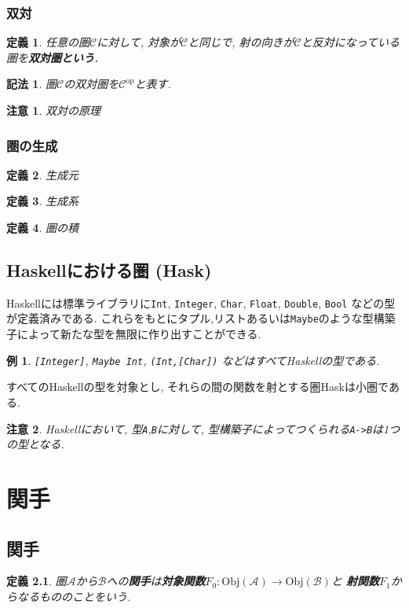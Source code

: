 \documentclass{jsbook}
\theoremstyle{plain}
\newtheorem{Def}{定義}[chapter]
\newtheorem{Notation}{記法}[chapter]
\newtheorem{caution}{注意}[chapter]
\newtheorem{example}{例}[chapter]
\begin{document}
\subsection{双対}
\begin{Def}
任意の圏$\mathscr{C}$に対して, 対象が$\mathscr{C}$と同じで, 射の向きが$\mathcal{C}$と反対になっている圏を\bf{双対圏}という.
\end{Def}
\begin{Notation}
圏$\mathscr{C}$の双対圏を$\mathscr{C}^{\mathrm{op}}$と表す.
\end{Notation}
\begin{caution}
双対の原理
\end{caution}
\subsection{圏の生成}
\begin{Def}
生成元
\end{Def}
\begin{Def}
生成系
\end{Def}
\begin{Def}
圏の積
\end{Def}
\section{Haskellにおける圏 (Hask)}
Haskellには標準ライブラリに\verb|Int|, \verb|Integer|, 
\verb|Char|,
\verb|Float|,
\verb|Double|,
\verb|Bool|
などの型が定義済みである.
これらをもとにタプル,リストあるいは\verb|Maybe|のような型構築子によって新たな型を無限に作り出すことができる.
\begin{example}
\verb|[Integer]|, \verb|Maybe Int|,
\verb|(Int,[Char])| などはすべてHaskellの型である.
\end{example}

すべてのHaskellの型を対象とし, それらの間の関数を射とする圏Haskは小圏である.
\begin{caution}
Haskellにおいて, 型\verb|A|,\verb|B|に対して, 型構築子によってつくられる\verb|A->B|は1つの型となる.
\end{caution}

\chapter{関手}
\section{関手}
\begin{Def}
圏$\mathscr{A}$から$\mathscr{B}$への{\bf 関手}は{\bf 対象関数}$F_0:\mathrm{Obj}(\mathscr{A})\rightarrow\mathrm{Obj}(\mathscr{B})$と
{\bf 射関数}$F_1$からなるもののことをいう.
\end{Def}
\end{document}
